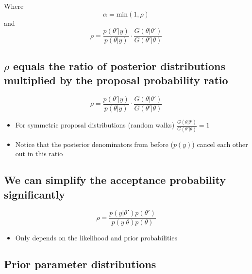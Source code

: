 \documentclass[
  letterpaper,
  DIV=11,
  numbers=noendperiod]{scrartcl}
\providecommand{\tightlist}{%
  \setlength{\itemsep}{0pt}\setlength{\parskip}{0pt}}\usepackage{longtable,booktabs,array}
\begin{document}
Where \[\alpha = \text{min}(1, \rho)\] and
\[\rho = \frac{p(\theta'|y)}{p(\theta|y)} \cdot \frac{G(\theta|\theta')}{G(\theta'|\theta)}\]

\hypertarget{rho-equals-the-ratio-of-posterior-distributions-multiplied-by-the-proposal-probability-ratio}{%
\subsection{\texorpdfstring{\(\rho\) equals the ratio of posterior
distributions multiplied by the proposal probability
ratio}{\textbackslash rho equals the ratio of posterior distributions multiplied by the proposal probability ratio}}\label{rho-equals-the-ratio-of-posterior-distributions-multiplied-by-the-proposal-probability-ratio}}

\Huge

\[\rho = \frac{p(\theta'|y)}{p(\theta|y)} \cdot \frac{G(\theta|\theta')}{G(\theta'|\theta)}\]
\large

\begin{itemize}
\tightlist
\item
  For symmetric proposal distributions (random walks)
  \(\frac{G(\theta|\theta')}{G(\theta'|\theta)} = 1\)
\item
  Notice that the posterior denominators from before (\(p(y)\)) cancel
  each other out in this ratio
\end{itemize}

\hypertarget{we-can-simplify-the-acceptance-probability-significantly}{%
\subsection{We can simplify the acceptance probability
significantly}\label{we-can-simplify-the-acceptance-probability-significantly}}

\Huge

\[\rho = \frac{p(y|\theta')p(\theta')}{p(y|\theta)p(\theta)}\] \Large

\begin{itemize}
\tightlist
\item
  Only depends on the likelihood and prior probabilities
\end{itemize}

\hypertarget{prior-parameter-distributions}{%
\subsection{Prior parameter
distributions}\label{prior-parameter-distributions}}
\end{document}
